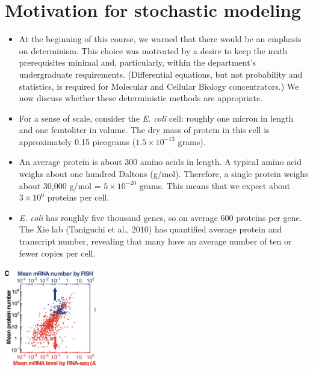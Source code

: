 \documentclass{article}
\begin{document}
\large

\section*{Motivation for stochastic modeling}

\begin{itemize}
\item At the beginning of this course, we warned that there would be an emphasis on determinism. This choice was motivated by a desire to keep the math prerequisites minimal and, particularly, within the department's undergraduate requirements. (Differential equations, but not probability and statistics, is required for Molecular and Cellular Biology concentrators.) We now discuss whether these deterministic methods are appropriate.
\item For a sense of scale, consider the \textit{E. coli} cell: roughly one micron in length and one femtoliter in volume. The dry mass of protein in this cell is approximately 0.15 picograms ($1.5 \times 10^{-13}$ grams).
\item An average protein is about 300 amino acids in length. A typical amino acid weighs about one hundred Daltons (g/mol). Therefore, a single protein weighs about 30,000 g/mol = $5 \times 10^{-20}$ grams. This means that we expect about $3 \times 10^{6}$ proteins per cell.
\item \textit{E. coli} has roughly five thousand genes, so on average 600 proteins per gene. The Xie lab (Taniguchi et al., 2010) has quantified average protein and transcript number, revealing that many have an average number of ten or fewer copies per cell.
\end{itemize}
\begin{center}
\includegraphics[width=0.3\textwidth]{xie_2010.png}
\end{center}
\end{document}
